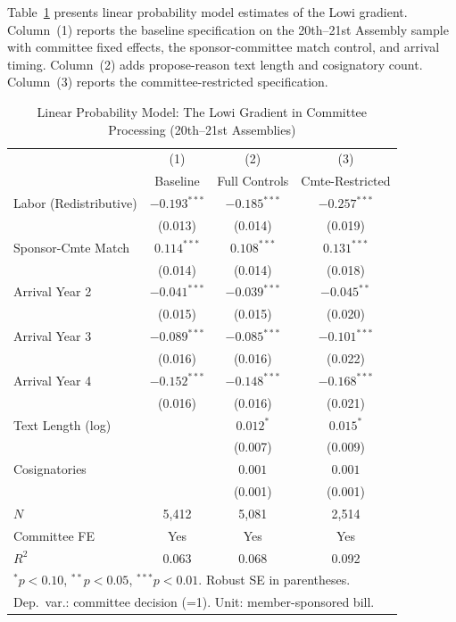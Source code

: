 \documentclass[11pt]{article}
\begin{document}
Table~\ref{tab:main} presents linear probability model estimates of the Lowi gradient. Column~(1) reports the baseline specification on the 20th--21st Assembly sample with committee fixed effects, the sponsor-committee match control, and arrival timing. Column~(2) adds propose-reason text length and cosignatory count. Column~(3) reports the committee-restricted specification.

\begin{table}[H]
\centering
\caption{Linear Probability Model: The Lowi Gradient in Committee Processing (20th--21st Assemblies)}
\label{tab:main}
\begin{tabular}{lccc}
\toprule
 & (1) & (2) & (3) \\
 & Baseline & Full Controls & Cmte-Restricted \\
\midrule
Labor (Redistributive)  & $-0.193^{***}$ & $-0.185^{***}$ & $-0.257^{***}$ \\
                         & (0.013)        & (0.014)        & (0.019)        \\[4pt]
Sponsor-Cmte Match       & $0.114^{***}$  & $0.108^{***}$  & $0.131^{***}$  \\
                         & (0.014)        & (0.014)        & (0.018)        \\[4pt]
Arrival Year 2           & $-0.041^{***}$ & $-0.039^{***}$ & $-0.045^{**}$  \\
                         & (0.015)        & (0.015)        & (0.020)        \\[4pt]
Arrival Year 3           & $-0.089^{***}$ & $-0.085^{***}$ & $-0.101^{***}$ \\
                         & (0.016)        & (0.016)        & (0.022)        \\[4pt]
Arrival Year 4           & $-0.152^{***}$ & $-0.148^{***}$ & $-0.168^{***}$ \\
                         & (0.016)        & (0.016)        & (0.021)        \\[4pt]
Text Length (log)        &                & $0.012^{*}$    & $0.015^{*}$    \\
                         &                & (0.007)        & (0.009)        \\[4pt]
Cosignatories            &                & $0.001$        & $0.001$        \\
                         &                & (0.001)        & (0.001)        \\
\midrule
$N$                      & 5,412          & 5,081          & 2,514          \\
Committee FE             & Yes            & Yes            & Yes            \\
$R^2$                    & 0.063          & 0.068          & 0.092          \\
\bottomrule
\multicolumn{4}{l}{\footnotesize $^{*}p<0.10$, $^{**}p<0.05$, $^{***}p<0.01$. Robust SE in parentheses.} \\
\multicolumn{4}{l}{\footnotesize Dep.\ var.: committee decision (=1). Unit: member-sponsored bill.} \\
\end{tabular}
\end{table}
\end{document}
